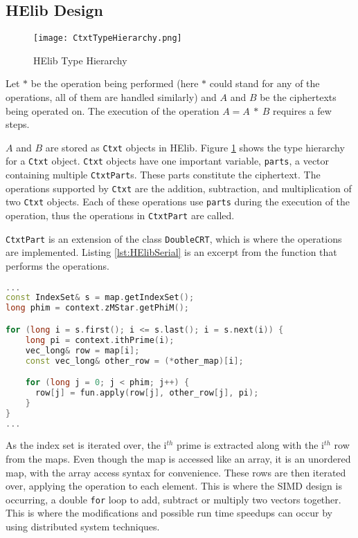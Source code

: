 \subsection{HElib Design} \label{sec:HElibSerialDesign}
\begin{figure}[htp]
\centering
\texttt{[image: CtxtTypeHierarchy.png]}
\caption{HElib Type Hierarchy}
\label{fig:CtxtTypeHierarchy}
\end{figure}

Let $\ast$ be the operation being performed (here $\ast$ could stand for any of the operations, all of them are handled similarly) and $A$ and $B$ be the ciphertexts being operated on. The execution of the operation $ A = A\ \ast\  B$ requires a few steps. 

$A$ and $B$ are stored as \verb|Ctxt| objects in HElib. Figure \ref{fig:CtxtTypeHierarchy} shows the type hierarchy for a \verb|Ctxt| object. \verb|Ctxt| objects have one important variable, \verb|parts|, a vector containing multiple \verb|CtxtPart|s. These parts constitute the ciphertext. The operations supported by \verb|Ctxt| are the addition, subtraction, and multiplication of two \verb|Ctxt| objects. Each of these operations use \verb|parts| during the execution of the operation, thus the operations in \verb|CtxtPart| are called.

\verb|CtxtPart| is an extension of the class \verb|DoubleCRT|, which is where the operations are implemented. Listing \ref{lst:HElibSerial} is an excerpt from the function that performs the operations.

\begin{lstlisting}[language=C++,caption={Add, Sub and Mul operations of two DoubleCRT objects},label={lst:HElibSerial}]
...
const IndexSet& s = map.getIndexSet();
long phim = context.zMStar.getPhiM();

for (long i = s.first(); i <= s.last(); i = s.next(i)) {
    long pi = context.ithPrime(i);
    vec_long& row = map[i];
    const vec_long& other_row = (*other_map)[i];

    for (long j = 0; j < phim; j++) {
      row[j] = fun.apply(row[j], other_row[j], pi);
    }
}
...
\end{lstlisting}

As the index set is iterated over, the i$^{th}$ prime is extracted along with the i$^{th}$ row from the maps. Even though the map is accessed like an array, it is an unordered map, with the array access syntax for convenience. These rows are then iterated over, applying the operation to each element. This is where the SIMD design is occurring, a double \verb|for| loop to add, subtract or multiply two vectors together. This is where the modifications and possible run time speedups can occur by using distributed system techniques.

